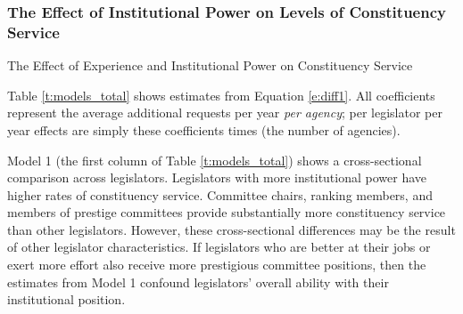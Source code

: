 \documentclass[12pt]{article}
\begin{document}
\subsubsection{The Effect of Institutional Power on Levels of Constituency Service}\label{s:prestigeresults}

\begin{table}[hbt!]
\caption{The Effect of Experience and Institutional Power on Constituency Service} \label{t:models_total}
\begin{minipage}{\textwidth}
\begin{center}
\end{center}
\end{minipage}
\end{table}

Table \ref{t:models_total} shows estimates from Equation \ref{e:diff1}. All coefficients represent the average additional requests per year \textit{per agency}; per legislator per year effects are simply these coefficients times  (the number of agencies).



Model 1 (the first column of Table \ref{t:models_total}) shows a cross-sectional comparison across legislators. Legislators with more institutional power have higher rates of constituency service. %
Committee chairs, ranking members, and members of prestige committees %
provide substantially more constituency service than other legislators. However, these cross-sectional differences may be the result of other legislator characteristics. If legislators who are better at their jobs or exert more effort also receive more prestigious committee positions, then the estimates from Model 1 confound legislators' overall ability with their institutional position.   
\end{document}
